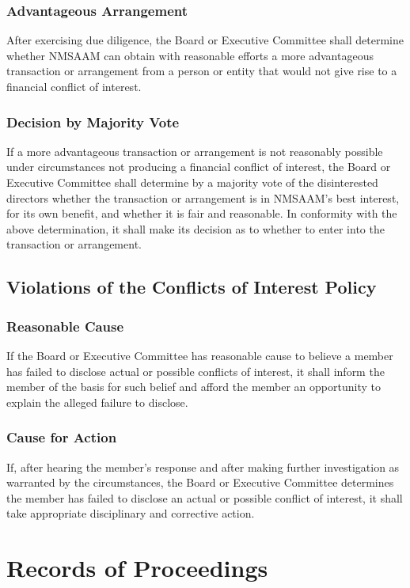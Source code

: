 \documentclass[letterpaper,12pt]{article}
\begin{document}
\subsubsection{Advantageous Arrangement}
\label{sec:org1151b2a}
After exercising due diligence, the Board or Executive Committee
shall determine whether NMSAAM can obtain with reasonable efforts
a more advantageous transaction or arrangement from a person or
entity that would not give rise to a financial conflict of
interest.
\subsubsection{Decision by Majority Vote}
\label{sec:org1454e8b}
If a more advantageous transaction or arrangement is not
reasonably possible under circumstances not producing a financial
conflict of interest, the Board or Executive Committee shall
determine by a majority vote of the disinterested directors
whether the transaction or arrangement is in NMSAAM's best
interest, for its own benefit, and whether it is fair and
reasonable. In conformity with the above determination, it shall
make its decision as to whether to enter into the transaction or
arrangement.
\subsection{Violations of the Conflicts of Interest Policy}
\label{sec:org3774254}
\subsubsection{Reasonable Cause}
\label{sec:org683412a}
If the Board or Executive Committee has reasonable cause to
believe a member has failed to disclose actual or possible
conflicts of interest, it shall inform the member of the basis
for such belief and afford the member an opportunity to explain
the alleged failure to disclose.
\subsubsection{Cause for Action}
\label{sec:orga65da8e}
If, after hearing the member's response and after making further
investigation as warranted by the circumstances, the Board or
Executive Committee determines the member has failed to disclose
an actual or possible conflict of interest, it shall take
appropriate disciplinary and corrective action.
\section{Records of Proceedings}
\label{sec:org21949fa}
\end{document}
